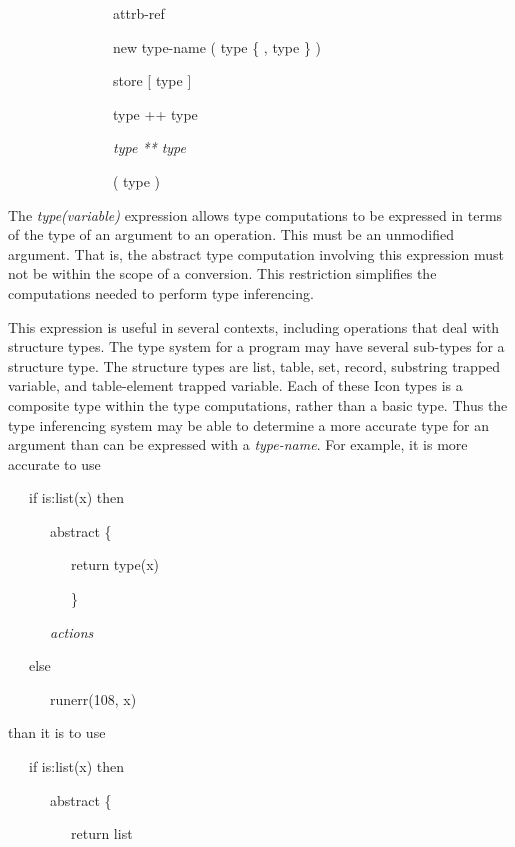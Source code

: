 {\ttfamily\mdseries
\ \ \ \ \ \ \ \ \ \ \ \ \ \ \ attrb-ref {\textbar}}

{\ttfamily\mdseries
\ \ \ \ \ \ \ \ \ \ \ \ \ \ \ new type-name ( type \{ , type \} ) {\textbar}}

{\ttfamily\mdseries
\ \ \ \ \ \ \ \ \ \ \ \ \ \ \ store [ type ] {\textbar}}

{\ttfamily\mdseries
\ \ \ \ \ \ \ \ \ \ \ \ \ \ \ type ++ type {\textbar}}

{\ttfamily\mdseries
\ \ \ \ \ \ \ \ \ \ \ \ \ \ \ \textit{type ** type} {\textbar}}

{\ttfamily\mdseries
\ \ \ \ \ \ \ \ \ \ \ \ \ \ \ ( type )}


The \textit{type(variable)} expression allows type computations to be
expressed in terms of the type of an argument to an operation. This
must be an unmodified argument. That is, the abstract type computation
involving this expression must not be within the scope of a
conversion. This restriction simplifies the computations needed to
perform type inferencing.

This expression is useful in several contexts, including operations
that deal with structure types. The type system for a program may have
several sub-types for a structure type. The structure types are list,
table, set, record, substring trapped variable, and table-element
trapped variable. Each of these Icon types is a composite type within
the type computations, rather than a basic type. Thus the type
inferencing system may be able to determine a more accurate type for
an argument than can be expressed with a \textit{type-name}. For
example, it is more accurate to use

{\ttfamily\mdseries
\ \ \ if is:list(x) then}

{\ttfamily\mdseries
\ \ \ \ \ \ abstract \{}

{\ttfamily\mdseries
\ \ \ \ \ \ \ \ \ return type(x)}

{\ttfamily\mdseries
\ \ \ \ \ \ \ \ \ \}}

{\ttfamily\mdseries
\ \ \ \ \ \ \textit{actions}}

{\ttfamily\mdseries
\ \ \ else}

{\ttfamily\mdseries
\ \ \ \ \ \ runerr(108, x)}


than it is to use 

{\ttfamily\mdseries
\ \ \ if is:list(x) then}

{\ttfamily\mdseries
\ \ \ \ \ \ abstract \{}

{\ttfamily\mdseries
\ \ \ \ \ \ \ \ \ return list}

